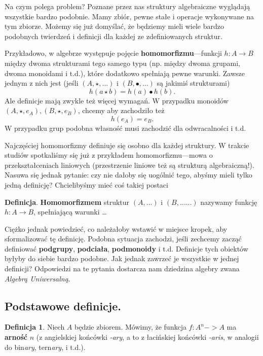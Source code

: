 \documentclass{article}
\theoremstyle{definition}
\newtheorem{definition}{Definicja}[section]
\begin{document}
Na czym polega problem?
Poznane przez nas struktury algebraiczne wyglądają wszystkie bardzo podobnie.
Mamy zbiór, pewne stałe i operacje wykonywane na tym zbiorze.
Możemy się już domyślać,
że będziemy mieli wiele bardzo podobnych twierdzeń i definicji dla każdej ze zdefiniowanych struktur.

Przykładowo,
w algebrze występuje pojęcie \textbf{homomorfizmu}---funkcji $h: A \to B$ między dwoma strukturami tego samego typu (np. między dwoma grupami, dwoma monoidami i t.d.),
które dodatkowo spełniają pewne warunki.
Zawsze jednym z nich jest (jeśli $(A, \star, \dots)$ i $(B, \bullet, \dots)$ są jakimiś strukturami)
\begin{equation}
	h(a\star b) = h(a) \bullet h(b).
\end{equation}
Ale definicje mają zwykle też więcej wymagań.
W przypadku monoidów $(A, \star, e_A), (B, \star, e_B)$,
chcemy aby zachodziło też
\begin{equation}
	h(e_A) = e_B.
\end{equation}
W przypadku grup podobna własność musi zachodzić dla odwracalności i t.d.

Najczęściej homomorfizmy definiuje się osobno dla każdej struktury.
W trakcie studiów spotkaliśmy się już z przykładem homomorfizmu---mowa o przekształceniach liniowych (przestrzenie liniowe też są strukturą algebraiczną!).
Nasuwa się jednak pytanie: czy nie dałoby się uogólnić tego, abyśmy mieli tylko jedną definicję? Chcielibyśmy mieć coś takiej postaci

\noindent \textbf{Definicja}. \textbf{Homomorfizmem} struktur $(A, \dots)$ i $(B, \dots...)$ nazywamy funkcję $h: A \to B$, spełniającą warunki \dots

Ciężko jednak powiedzieć, co należałoby wstawić w miejsce kropek, aby sformalizować tę definicję.
Podobna sytuacja zachodzi,
    jeśli zechcemy zacząć definiować \textbf{podgrupy}, \textbf{podciała}, \textbf{podmonoidy} i t.d.
Definicje tych obiektów byłyby do siebie bardzo podobne.
Jak jednak zawrzeć je wszystkie w jednej definicji?
Odpowiedzi na te pytania dostarcza nam dziedzina algebry zwana \textit{Algebrą Uniwersalną}.

\subsection{Podstawowe definicje.}

\begin{definition}
	Niech $A$ będzie zbiorem.
	Mówimy, że funkcja $f: A^n -> A$ ma \textbf{arność} $n$ (z angielskiej końcówki \textit{-ary}, a to z łacińskiej końcówki \textit{-aris}, w analogii do bin\textit{ary}, tern\textit{ary}, i t.d.).
\end{definition}
\end{document}
